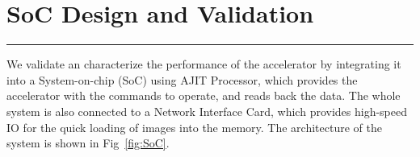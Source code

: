 \documentclass[12pt]{report}
\begin{document}
 

\newpage
\chapter{SoC Design and Validation} \label{3}
\rule[10pt]{\linewidth}{3pt}
We validate an characterize the performance of the accelerator by integrating it into a System-on-chip (SoC) using AJIT Processor, which provides the accelerator with the commands to operate, and reads back the data. The whole system is also connected to a Network Interface Card, which provides high-speed IO for the quick loading of images into the memory. The architecture of the system is shown in Fig~\ref{fig:SoC}.
\\
\end{document}
